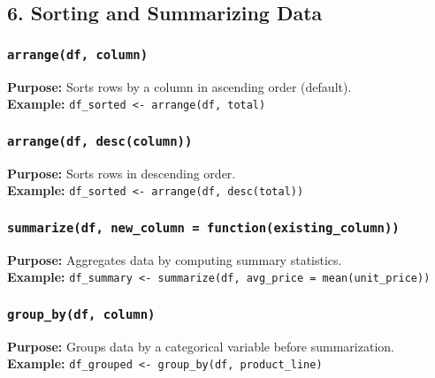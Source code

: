 \documentclass[
  11pt,
]{article}
\begin{document}
\subsection{\texorpdfstring{\textbf{6. Sorting and Summarizing
Data}}{6. Sorting and Summarizing Data}}\label{sorting-and-summarizing-data}

\subsubsection{\texorpdfstring{\textbf{\texttt{arrange(df,\ column)}}}{arrange(df, column)}}\label{arrangedf-column}

\textbf{Purpose:} Sorts rows by a column in ascending order (default).\\
\textbf{Example:} \texttt{df\_sorted\ \textless{}-\ arrange(df,\ total)}

\subsubsection{\texorpdfstring{\textbf{\texttt{arrange(df,\ desc(column))}}}{arrange(df, desc(column))}}\label{arrangedf-desccolumn}

\textbf{Purpose:} Sorts rows in descending order.\\
\textbf{Example:}
\texttt{df\_sorted\ \textless{}-\ arrange(df,\ desc(total))}

\subsubsection{\texorpdfstring{\textbf{\texttt{summarize(df,\ new\_column\ =\ function(existing\_column))}}}{summarize(df, new\_column = function(existing\_column))}}\label{summarizedf-new_column-functionexisting_column}

\textbf{Purpose:} Aggregates data by computing summary statistics.\\
\textbf{Example:}
\texttt{df\_summary\ \textless{}-\ summarize(df,\ avg\_price\ =\ mean(unit\_price))}

\subsubsection{\texorpdfstring{\textbf{\texttt{group\_by(df,\ column)}}}{group\_by(df, column)}}\label{group_bydf-column}

\textbf{Purpose:} Groups data by a categorical variable before
summarization.\\
\textbf{Example:}
\texttt{df\_grouped\ \textless{}-\ group\_by(df,\ product\_line)}
\end{document}
